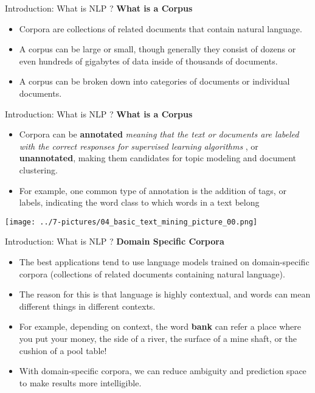 \documentclass[11pt]{beamer}
\begin{document}
\begin{frame}{Introduction: What is NLP ?}
\textbf{What is a Corpus}
	\begin{itemize}
		\item Corpora are collections of related documents that contain natural language. 
		\item A corpus can be large or small, though generally they consist of dozens or even hundreds of gigabytes of data inside of thousands of documents.
		\item A corpus can be broken down into categories of documents or individual documents.
	\end{itemize}
\end{frame}
\begin{frame}{Introduction: What is NLP ?}
\textbf{What is a Corpus}
	\begin{itemize}
		\item Corpora can be \textbf{annotated}  \textit{meaning that the text or documents are labeled with the correct responses for supervised learning algorithms }, or \textbf{unannotated}, making them candidates for topic modeling and document clustering.
		\item  For example, one common type of annotation is the addition of tags, or labels, indicating the word class to which words in a text belong
	\end{itemize}
	\begin{center}
	\texttt{[image: ../7-pictures/04\_basic\_text\_mining\_picture\_00.png]}
	\end{center}
\end{frame}
\begin{frame}{Introduction: What is NLP ?}
\textbf{Domain Specific Corpora}
	\begin{itemize}
		\item  The best applications tend to use language models trained on domain-specific corpora (collections of related documents containing natural language). 
		\item The reason for this is that language is highly contextual, and words can mean different things in different contexts. 
		\item For example, depending on context, the word \textbf{bank} can refer a place where you put your money, the side of a river, the surface of a mine shaft, or the cushion of a pool table! 
		\item With domain-specific corpora, we can reduce ambiguity and prediction space to make results more intelligible.
	\end{itemize}
\end{frame}
\end{document}
